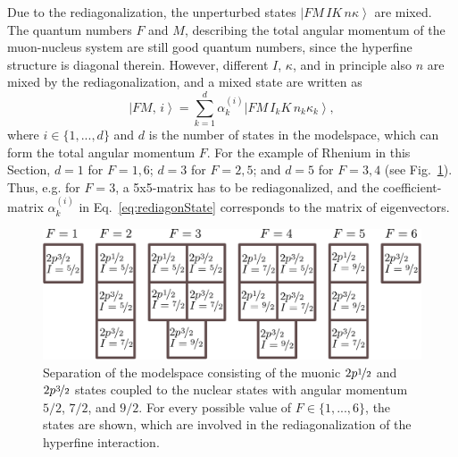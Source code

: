 Due to the rediagonalization, the unperturbed states $\left|FM\,IK\,n\kappa\right>$ are mixed. The quantum numbers $F$ and $M$, describing the total angular momentum of the muon-nucleus system are still good quantum numbers, since the hyperfine structure is diagonal therein. However, different $I$, $\kappa$, and in principle also $n$ are mixed by the rediagonalization, and a mixed state are written as
\begin{equation}
\label{eq:rediagonState}
\left|FM,\,i\right> = \sum_{k=1}^d \alpha^{(i)}_k \left| FM\,I_kK\,n_k\kappa_k\right>,
\end{equation}
where $i\in \{1,...,d\}$ and $d$ is the number of states in the modelspace, which can form the total angular momentum $F$. For the example of Rhenium in this Section, $d=1$ for $F=1,6$; $d=3$ for $F=2,5$; and $d=5$ for $F=3,4$ (see Fig.~\ref{fig:blockRe}). Thus, e.g. for $F=3$, a 5x5-matrix has to be rediagonalized, and the coefficient-matrix $\alpha^{(i)}_k$ in Eq.~\eqref{eq:rediagonState} corresponds to the matrix of eigenvectors.
%
\begin{figure}%
\centering
\includegraphics[width=0.91\linewidth]{pics/blocksRe.pdf}%
\caption{Separation of the modelspace consisting of the muonic $2p\nicefrac{1}{2}$ and $2p\nicefrac{3}{2}$ states coupled to the nuclear states with angular momentum $5/2$, $7/2$, and $9/2$. For every possible value of $F\in \{1,...,6\}$, the states are shown, which are involved in the rediagonalization of the hyperfine interaction.}%
\label{fig:blockRe}%
\end{figure}
%
%
